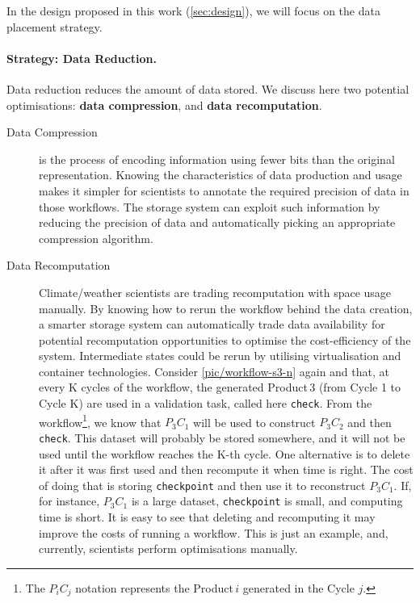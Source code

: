 \documentclass{superfri}
\newcommand{\lr}[1]{\textcolor{cyan}{LR: #1}}
\begin{document}
In the design proposed in this work (\cref{sec:design}), we will focus on the data placement strategy.

\paragraph{Strategy: Data Reduction.}

Data reduction reduces the amount of data stored.
We discuss here two potential optimisations: \textbf{data compression}, and \textbf{data recomputation}.

\begin{description}

\item[Data Compression] is the process of encoding information using fewer bits than the original representation.
Knowing the characteristics of data production and usage makes it simpler for scientists to annotate the required precision of data in those workflows.
The storage system can exploit such information by reducing the precision of data and automatically picking an appropriate compression algorithm.


\item[Data Recomputation] Climate/weather scientists are trading recomputation with space usage manually.%
By knowing how to rerun the workflow behind the data creation, a smarter storage system can automatically trade data availability for potential recomputation opportunities to optimise the cost-efficiency of the system.
Intermediate states could be rerun by utilising virtualisation and container technologies.
Consider \cref{pic/workflow-s3-n} again and that, at every K cycles of the workflow, the generated Product\,3 (from Cycle 1 to Cycle K) are used in a validation task, called here \texttt{check}.
From the workflow\footnote{The $P_i C_j$ notation represents the Product\,$i$ generated in the Cycle $j$.}, we know that $P_3 C_1$ will be used to construct $P_3 C_2$ and then \texttt{check}.
This dataset will probably be stored somewhere, and it will not be used until the workflow reaches the K-th cycle.
One alternative is to delete it after it was first used and then recompute it when time is right.
The cost of doing that is storing \texttt{checkpoint} and then use it to reconstruct $P_3 C_1$.
If, for instance, $P_3 C_1$ is a large dataset, \texttt{checkpoint} is small, and computing time is short.
It is easy to see that deleting and recomputing it may improve the costs of running a workflow.
This is just an example, and, currently, scientists perform optimisations manually.
\end{description}
\end{document}
